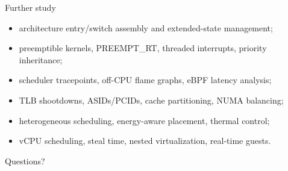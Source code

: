 \documentclass[aspectratio=169,11pt]{beamer}
\begin{document}
\begin{frame}{Further study}
  \begin{itemize}
    \item architecture entry/switch assembly and extended-state management;
    \item preemptible kernels, PREEMPT\_RT, threaded interrupts, priority inheritance;
    \item scheduler tracepoints, off-CPU flame graphs, eBPF latency analysis;
    \item TLB shootdowns, ASIDs/PCIDs, cache partitioning, NUMA balancing;
    \item heterogeneous scheduling, energy-aware placement, thermal control;
    \item vCPU scheduling, steal time, nested virtualization, real-time guests.
  \end{itemize}
  \begin{center}
    \Large Questions?
  \end{center}
\end{frame}
\end{document}
